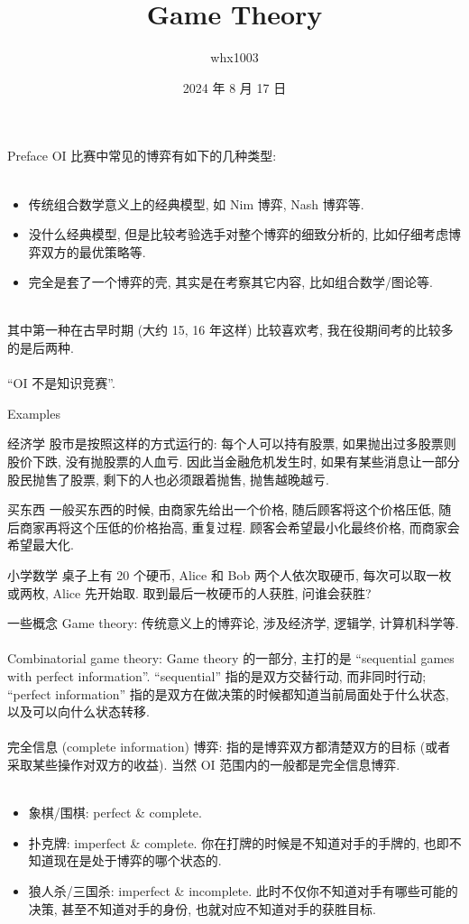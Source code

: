 \documentclass{beamer}
\title{Game Theory}
\author{whx1003}
\date{2024 年 8 月 17 日}
\newcommand{\nl}{\\\hspace*{\fill}\\}
\begin{document}
	\maketitle

	\begin{frame}{Preface}
		OI 比赛中常见的博弈有如下的几种类型:\nl
		\begin{itemize}
			\item 传统组合数学意义上的经典模型, 如 Nim 博弈, Nash 博弈等.\\
			\item 没什么经典模型, 但是比较考验选手对整个博弈的细致分析的, 比如仔细考虑博弈双方的最优策略等.\\
			\item 完全是套了一个博弈的壳, 其实是在考察其它内容, 比如组合数学/图论等.\nl
		\end{itemize}
		其中第一种在古早时期 (大约 15, 16 年这样) 比较喜欢考, 我在役期间考的比较多的是后两种.\nl
		``OI 不是知识竞赛''.
	\end{frame}

	\begin{frame}{Examples}
		\begin{block}{经济学}
			股市是按照这样的方式运行的: 每个人可以持有股票, 如果抛出过多股票则股价下跌, 没有抛股票的人血亏. 因此当金融危机发生时, 如果有某些消息让一部分股民抛售了股票, 剩下的人也必须跟着抛售, 抛售越晚越亏.
		\end{block}
		\begin{block}{买东西}
			一般买东西的时候, 由商家先给出一个价格, 随后顾客将这个价格压低, 随后商家再将这个压低的价格抬高, 重复过程. 顾客会希望最小化最终价格, 而商家会希望最大化.
		\end{block}
		\begin{block}{小学数学}
			桌子上有 20 个硬币, Alice 和 Bob 两个人依次取硬币, 每次可以取一枚或两枚, Alice 先开始取. 取到最后一枚硬币的人获胜, 问谁会获胜?
		\end{block}
	\end{frame}

	\begin{frame}{一些概念}
		Game theory: 传统意义上的博弈论, 涉及经济学, 逻辑学, 计算机科学等.\nl
		Combinatorial game theory: Game theory 的一部分, 主打的是 ``sequential games with perfect information''. ``sequential'' 指的是双方交替行动, 而非同时行动; ``perfect information'' 指的是双方在做决策的时候都知道当前局面处于什么状态, 以及可以向什么状态转移.\nl
		完全信息 (complete information) 博弈: 指的是博弈双方都清楚双方的目标 (或者采取某些操作对双方的收益). 当然 OI 范围内的一般都是完全信息博弈.\nl
		\begin{itemize}
			\item 象棋/围棋: perfect \& complete.\\
			\item 扑克牌: imperfect \& complete. 你在打牌的时候是不知道对手的手牌的, 也即不知道现在是处于博弈的哪个状态的.\\
			\item 狼人杀/三国杀: imperfect \& incomplete. 此时不仅你不知道对手有哪些可能的决策, 甚至不知道对手的身份, 也就对应不知道对手的获胜目标.
		\end{itemize}
	\end{frame}
\end{document}
